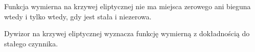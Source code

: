 \begin{corollary}\label{zero_div_const_fun_coro}
Funkcja wymierna na krzywej eliptycznej
nie ma miejsca zerowego ani bieguna wtedy i tylko wtedy,
gdy jest stała i niezerowa.
\end{corollary}

\begin{corollary}\label{fun_divi_equiv_to_const_lemma}
Dywizor na krzywej eliptycznej
wyznacza funkcję wymierną z dokładnością do stałego czynnika.
\end{corollary}
